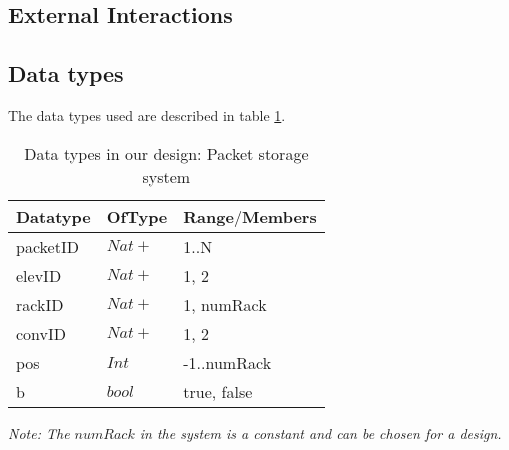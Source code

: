 \subsection*{External Interactions}


\subsection*{Data types}
The data types used are described in table \ref{tab: data_types}.
\begin{table}[ht]
\centering
\begin{tabular}{|l|l|l|}\hline
Datatype & OfType & Range$\slash$Members\\\hline
packetID & $Nat+$ & {1..N} \\\hline
elevID & $Nat+$ & {1, 2}\\\hline
rackID & $Nat+$ & {1, numRack}\\\hline
convID & $Nat+$ & {1, 2}\\\hline
pos & $Int$ & {-1..numRack}\\\hline
b & $bool$ & {true, false} \\\hline
\end{tabular}
\caption{Data types in our design: Packet storage system }
\label{tab: data_types}
\end{table}

\textit{Note: The $numRack$ in the system is a constant and can be
chosen for a design.}
